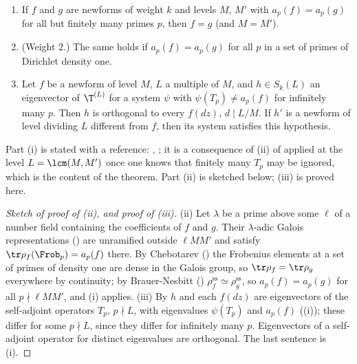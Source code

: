 \begin{theorem}\label{thm:hecke:strong-multiplicity-one}
\begin{enumerate}[label=(\roman*)]
\item If $f$ and $g$ are newforms of weight $k$ and levels $M$, $M'$ with $a_p(f)=a_p(g)$ for all but finitely many primes $p$, then $f=g$ (and $M=M'$).
\item (Weight $2$.) The same holds if $a_p(f)=a_p(g)$ for all $p$ in a set of primes of Dirichlet density one.
\item Let $f$ be a newform of level $M$, $L$ a multiple of $M$, and $h\in S_k(L)$ an eigenvector of $\T^{(L)}$ for a system $\psi$ with $\psi(T_p)\ne a_p(f)$ for infinitely many $p$. Then $h$ is
orthogonal to every $f(dz)$, $d\mid L/M$. If $h'$ is a newform of level dividing $L$ different from $f$, then its system satisfies this hypothesis.
\end{enumerate}
Part (i) is stated with a reference: \cite[Theorem 4.6.19]{Miyake}, \cite{Li75}; it is a consequence of (ii) of 
applied at the level $L=\lcm(M,M')$ once one knows that finitely many $T_p$ may be ignored, which is the content of the theorem. Part (ii) is sketched below; (iii) is proved here.
\end{theorem}

\begin{proof}[Sketch of proof of (ii), and proof of (iii)]
(ii) Let $\lambda$ be a prime above some $\ell$ of a number field containing the coefficients of $f$ and $g$. Their $\lambda$-adic Galois representations () are unramified
outside $\ell MM'$ and satisfy $\tr\rho_f(\Frob_p)=a_p(f)$ there. By Chebotarev () the Frobenius elements at a set of primes of density one are dense in the Galois group, so
$\tr\rho_f=\tr\rho_g$ everywhere by continuity; by Brauer-Nesbitt () $\rho_f^{\mathrm{ss}}\simeq\rho_g^{\mathrm{ss}}$, so $a_p(f)=a_p(g)$ for all $p\nmid\ell MM'$, and (i) applies.
(iii) By  $h$ and each $f(dz)$ are eigenvectors of the self-adjoint operators $T_p$, $p\nmid L$, with eigenvalues $\psi(T_p)$ and $a_p(f)$ ((i));
these differ for some $p\nmid L$, since they differ for infinitely many $p$. Eigenvectors of a self-adjoint operator for distinct eigenvalues are orthogonal. The last sentence is (i).
\end{proof}

